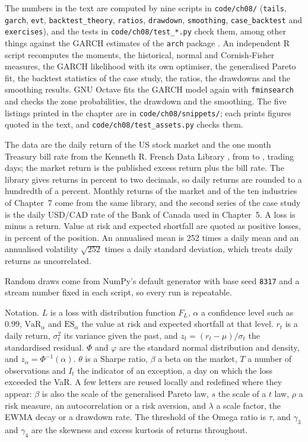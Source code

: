 \begin{chapterrefs}
\begin{keybox}
The numbers in the text are computed by nine scripts in \texttt{code/ch08/} (\texttt{tails},
\texttt{garch}, \texttt{evt}, \texttt{backtest\_theory}, \texttt{ratios}, \texttt{drawdown},
\texttt{smoothing}, \texttt{case\_backtest} and \texttt{exercises}), and the tests in
\texttt{code/ch08/test\_*.py} check them, among other things against the GARCH estimates of the
\texttt{arch} package \parencite{arch}. An independent R script recomputes the moments, the
historical, normal and Cornish-Fisher measures, the GARCH likelihood with its own optimiser, the
generalised Pareto fit, the backtest statistics of the case study, the ratios, the drawdowns and the
smoothing results. GNU Octave fits the GARCH model again with \texttt{fminsearch} and checks the
zone probabilities, the drawdown and the smoothing. The five listings printed in the chapter are
in \texttt{code/ch08/snippets/}; each prints figures quoted in the text, and
\texttt{code/ch08/test\_assets.py} checks them.

The data are the daily return of the US stock market and the one month Treasury bill rate from the
Kenneth R. French Data Library \parencite{frenchlib}, from \tdFirst{} to \tdLast, \tdN{} trading days;
the market return is the published excess return plus the bill rate. The library gives returns in
percent to two decimals, so daily returns are rounded to a hundredth of a percent. Monthly returns of
the market and of the ten industries of Chapter~7 come from the same library, and the
second series of the case study is the daily USD/CAD rate of the Bank of Canada used in Chapter~5.
A loss is minus a return. Value at risk and expected shortfall are quoted as positive losses, in
percent of the position. An annualised mean is 252 times a daily mean and an annualised volatility
$\sqrt{252}$ times a daily standard deviation, which treats daily returns as uncorrelated.

Random draws come from NumPy's default generator with base seed \texttt{8317} and a stream number
fixed in each script, so every run is repeatable.

Notation. $L$ is a loss with distribution function $F_L$, $\alpha$ a confidence level such as 0.99,
$\mathrm{VaR}_\alpha$ and $\mathrm{ES}_\alpha$ the value at risk and expected shortfall at that
level. $r_t$ is a daily return, $\sigma_t^2$ its variance given the past, and $z_t=(r_t-\mu)/\sigma_t$
the standardised residual. $\Phi$ and $\varphi$ are the standard normal distribution and density, and
$z_\alpha=\Phi^{-1}(\alpha)$. $\theta$ is a Sharpe ratio, $\beta$ a beta on the market, $T$ a number of
observations and $I_t$ the indicator of an exception, a day on which the loss exceeded the VaR.
A few letters are reused locally and redefined where they appear: $\beta$ is also the scale of the
generalised Pareto law, $s$ the scale of a $t$ law, $\rho$ a risk measure, an autocorrelation or a
risk aversion, and $\lambda$ a scale factor, the EWMA decay or a drawdown rate. The threshold of the
Omega ratio is $\tau$, and $\gamma_3$ and $\gamma_4$ are the skewness and excess kurtosis of returns
throughout.
\end{keybox}


\end{chapterrefs}
